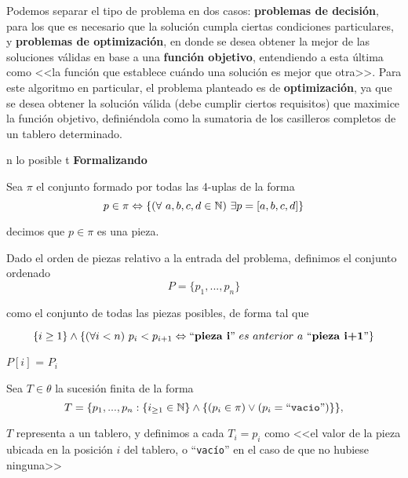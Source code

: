 \documentclass[11pt, a4paper, twoside]{article}
\begin{document}
Podemos separar el tipo de problema en dos casos: \textbf{problemas de
decisión}, para los que es necesario que la solución cumpla ciertas condiciones
particulares, y \textbf{problemas de optimización}, en donde se desea obtener la
mejor de las soluciones válidas en base a una \textbf{función objetivo},
entendiendo a esta última como <<la función que establece cuándo una solución es
mejor que otra>>. Para este algoritmo en particular, el problema planteado es de
\textbf{optimización}, ya que se desea obtener la solución válida (debe cumplir
ciertos requisitos) que maximice la función objetivo, definiéndola como la
sumatoria de los casilleros completos de un tablero determinado.

\begin{center}n lo posible t
\textbf{Formalizando}
\end{center}


\begin{notacion}
Sea $\pi$ el conjunto formado por todas las 4-uplas de la forma
\[
p \in \pi \Leftrightarrow \{(\forall~{a, b, c, d} \in \mathbb{N})~\exists p = [a, b, c, d]\}
\]
\begin{flushright}
decimos que $p \in \pi$ es una pieza.
\end{flushright}
\end{notacion}



\begin{definicion}

Dado el orden de piezas relativo a la entrada del problema, definimos el
conjunto ordenado
\[
P = \{p_1, ..., p_n\}
\]
\begin{center}
como el conjunto de todas las piezas posibles, de forma tal que 
\end{center}
\[
\{i\geq 1\} \land \{(\forall{i<n})\ p_i < p_{i+1} \Leftrightarrow ``\textbf{pieza~i}"~es~anterior~a~``\textbf{pieza~i+1}"\}
\]

\end{definicion}
\begin{notacion}

$P[i]$ = $P_i$

\end{notacion}



\begin{definicion}

Sea $T \in \theta$ la sucesión finita de la forma 
\[
T = \{p_1, ..., p_n : \{i_{\geq 1}\in\mathbb{N}\} \land \{(p_i \in \pi) \lor (p_i = ``\texttt{vacio}")\}\},
\]

$T$ representa a un tablero, y definimos a cada $T_i = p_i$ como <<el valor de
la pieza ubicada en la posición $i$ del tablero, o ``\texttt{vacío}'' en el caso de que
no hubiese ninguna>>

\end{definicion}
\end{document}
